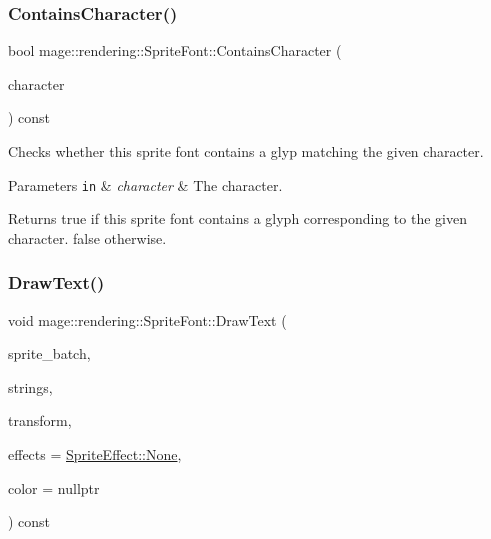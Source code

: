 \subsubsection{\texorpdfstring{Contains\+Character()}{ContainsCharacter()}}
{\footnotesize\ttfamily bool mage\+::rendering\+::\+Sprite\+Font\+::\+Contains\+Character (\begin{DoxyParamCaption}\item[{wchar\+\_\+t}]{character }\end{DoxyParamCaption}) const}

Checks whether this sprite font contains a glyp matching the given character.


\begin{DoxyParams}[1]{Parameters}
\mbox{\tt in}  & {\em character} & The character. \\
\hline
\end{DoxyParams}
\begin{DoxyReturn}{Returns}
{\ttfamily true} if this sprite font contains a glyph corresponding to the given character. {\ttfamily false} otherwise. 
\end{DoxyReturn}
\hypertarget{classmage_1_1rendering_1_1_sprite_font_a0be6671c77a11df1e11a7a1568caeb68}{}\label{classmage_1_1rendering_1_1_sprite_font_a0be6671c77a11df1e11a7a1568caeb68} 
\subsubsection{\texorpdfstring{Draw\+Text()}{DrawText()}}
{\footnotesize\ttfamily void mage\+::rendering\+::\+Sprite\+Font\+::\+Draw\+Text (\begin{DoxyParamCaption}\item[{\hyperlink{classmage_1_1rendering_1_1_sprite_batch}{Sprite\+Batch} \&}]{sprite\+\_\+batch,  }\item[{gsl\+::span$<$ const \hyperlink{classmage_1_1rendering_1_1_color_string}{Color\+String} $>$}]{strings,  }\item[{const \hyperlink{classmage_1_1_sprite_transform}{Sprite\+Transform} \&}]{transform,  }\item[{\hyperlink{namespacemage_1_1rendering_a4dbc3536c87b906f1d41d863ec458e78}{Sprite\+Effect}}]{effects = {\ttfamily \hyperlink{namespacemage_1_1rendering_a4dbc3536c87b906f1d41d863ec458e78a6adf97f83acf6453d4a6a4b1070f3754}{Sprite\+Effect\+::\+None}},  }\item[{const \hyperlink{structmage_1_1_r_g_b_a}{R\+G\+BA} $\ast$}]{color = {\ttfamily nullptr} }\end{DoxyParamCaption}) const}

